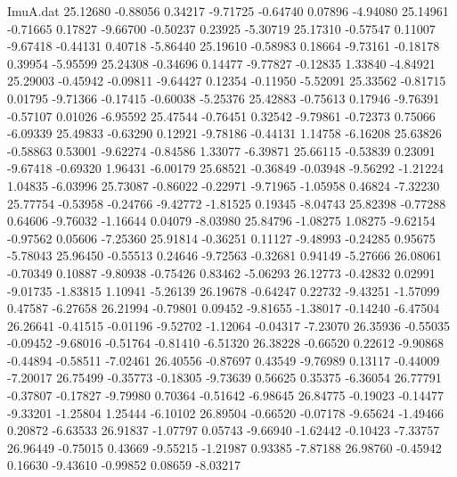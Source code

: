 \begin{filecontents}{ImuA.dat}
  25.12680   -0.88056    0.34217   -9.71725   -0.64740    0.07896   -4.94080
  25.14961   -0.71665    0.17827   -9.66700   -0.50237    0.23925   -5.30719
  25.17310   -0.57547    0.11007   -9.67418   -0.44131    0.40718   -5.86440
  25.19610   -0.58983    0.18664   -9.73161   -0.18178    0.39954   -5.95599
  25.24308   -0.34696    0.14477   -9.77827   -0.12835    1.33840   -4.84921
  25.29003   -0.45942   -0.09811   -9.64427    0.12354   -0.11950   -5.52091
  25.33562   -0.81715    0.01795   -9.71366   -0.17415   -0.60038   -5.25376
  25.42883   -0.75613    0.17946   -9.76391   -0.57107    0.01026   -6.95592
  25.47544   -0.76451    0.32542   -9.79861   -0.72373    0.75066   -6.09339
  25.49833   -0.63290    0.12921   -9.78186   -0.44131    1.14758   -6.16208
  25.63826   -0.58863    0.53001   -9.62274   -0.84586    1.33077   -6.39871
  25.66115   -0.53839    0.23091   -9.67418   -0.69320    1.96431   -6.00179
  25.68521   -0.36849   -0.03948   -9.56292   -1.21224    1.04835   -6.03996
  25.73087   -0.86022   -0.22971   -9.71965   -1.05958    0.46824   -7.32230
  25.77754   -0.53958   -0.24766   -9.42772   -1.81525    0.19345   -8.04743
  25.82398   -0.77288    0.64606   -9.76032   -1.16644    0.04079   -8.03980
  25.84796   -1.08275    1.08275   -9.62154   -0.97562    0.05606   -7.25360
  25.91814   -0.36251    0.11127   -9.48993   -0.24285    0.95675   -5.78043
  25.96450   -0.55513    0.24646   -9.72563   -0.32681    0.94149   -5.27666
  26.08061   -0.70349    0.10887   -9.80938   -0.75426    0.83462   -5.06293
  26.12773   -0.42832    0.02991   -9.01735   -1.83815    1.10941   -5.26139
  26.19678   -0.64247    0.22732   -9.43251   -1.57099    0.47587   -6.27658
  26.21994   -0.79801    0.09452   -9.81655   -1.38017   -0.14240   -6.47504
  26.26641   -0.41515   -0.01196   -9.52702   -1.12064   -0.04317   -7.23070
  26.35936   -0.55035   -0.09452   -9.68016   -0.51764   -0.81410   -6.51320
  26.38228   -0.66520    0.22612   -9.90868   -0.44894   -0.58511   -7.02461
  26.40556   -0.87697    0.43549   -9.76989    0.13117   -0.44009   -7.20017
  26.75499   -0.35773   -0.18305   -9.73639    0.56625    0.35375   -6.36054
  26.77791   -0.37807   -0.17827   -9.79980    0.70364   -0.51642   -6.98645
  26.84775   -0.19023   -0.14477   -9.33201   -1.25804    1.25444   -6.10102
  26.89504   -0.66520   -0.07178   -9.65624   -1.49466    0.20872   -6.63533
  26.91837   -1.07797    0.05743   -9.66940   -1.62442   -0.10423   -7.33757
  26.96449   -0.75015    0.43669   -9.55215   -1.21987    0.93385   -7.87188
  26.98760   -0.45942    0.16630   -9.43610   -0.99852    0.08659   -8.03217

\end{filecontents}
